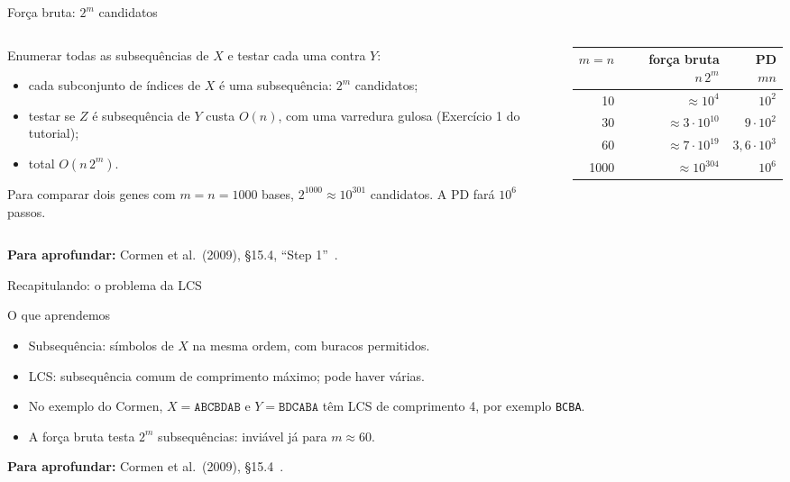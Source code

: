 \documentclass[aspectratio=169,xcolor=table]{beamer}
\newcommand{\fonte}[1]{%
  \vfill
  {\tiny\color{gray!55!black}\textbf{Para aprofundar:} #1\par}%
}
\begin{document}
\begin{frame}{Força bruta: $2^m$ candidatos}
  \begin{columns}[c]
    \begin{column}{0.52\textwidth}
      \scriptsize Enumerar todas as subsequências de $X$ e testar cada uma contra $Y$:
      \begin{itemize}\scriptsize
        \item cada subconjunto de índices de $X$ é uma subsequência: $2^m$ candidatos;
        \item testar se $Z$ é subsequência de $Y$ custa $O(n)$, com uma varredura gulosa
              (Exercício 1 do tutorial);
        \item total $O(n\,2^m)$.
      \end{itemize}
      Para comparar dois genes com $m = n = 1000$ bases, $2^{1000}\approx 10^{301}$
      candidatos. A PD fará $10^6$ passos.
    \end{column}
    \begin{column}{0.44\textwidth}
      \centering\scriptsize
      \begin{tabular}{rrr}
        \toprule
        $m=n$ & força bruta $n\,2^m$ & PD $mn$ \\
        \midrule
        10 & $\approx 10^4$ & $10^2$ \\
        30 & $\approx 3\cdot 10^{10}$ & $9\cdot 10^2$ \\
        60 & $\approx 7\cdot 10^{19}$ & $3{,}6\cdot 10^3$ \\
        1000 & $\approx 10^{304}$ & $10^6$ \\
        \bottomrule
      \end{tabular}
    \end{column}
  \end{columns}
  \fonte{Cormen et al.\ (2009), \S 15.4, ``Step 1''~\cite{cormen2009introduction}.}
\end{frame}

\begin{frame}{Recapitulando: o problema da LCS}
  \begin{block}{O que aprendemos}
    \begin{itemize}\scriptsize
      \item Subsequência: símbolos de $X$ na mesma ordem, com buracos permitidos.
      \item LCS: subsequência comum de comprimento máximo; pode haver várias.
      \item No exemplo do Cormen, $X=\texttt{ABCBDAB}$ e $Y=\texttt{BDCABA}$ têm LCS de
            comprimento 4, por exemplo \texttt{BCBA}.
      \item A força bruta testa $2^m$ subsequências: inviável já para $m \approx 60$.
    \end{itemize}
  \end{block}
  \fonte{Cormen et al.\ (2009), \S 15.4~\cite{cormen2009introduction}.}
\end{frame}
\end{document}
